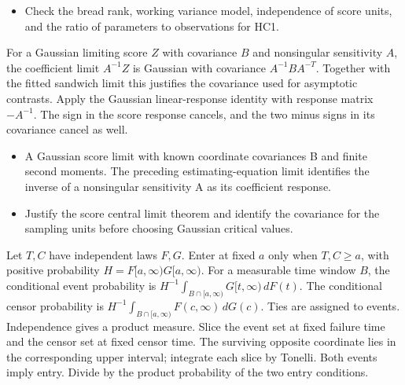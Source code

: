 \expandafter\def\csname statadic@diagnostics@STATADIC-GLMCOV-004\endcsname{\begin{itemize}
\item Check the bread rank, working variance model, independence of score units, and the ratio of parameters to observations for HC1.
\end{itemize}}
\expandafter\def\csname statadic@statement@STATADIC-GLMCOV-005\endcsname{For a Gaussian limiting score $Z$ with covariance $B$ and
  nonsingular sensitivity $A$, the coefficient limit $A^{-1}Z$ is Gaussian
  with covariance $A^{-1} B A^{-T}$. Together with the fitted sandwich limit
  this justifies the covariance used for asymptotic contrasts.}
\expandafter\def\csname statadic@proof@STATADIC-GLMCOV-005\endcsname{Apply the Gaussian linear-response identity with response
  matrix $-A^{-1}$. The sign in the score response cancels, and the two minus
  signs in its covariance cancel as well.}
\expandafter\def\csname statadic@assumptions@STATADIC-GLMCOV-005\endcsname{\begin{itemize}
\item A Gaussian score limit with known coordinate covariances B and finite second moments. The preceding estimating-equation limit identifies the inverse of a nonsingular sensitivity A as its coefficient response.
\end{itemize}}
\expandafter\def\csname statadic@diagnostics@STATADIC-GLMCOV-005\endcsname{\begin{itemize}
\item Justify the score central limit theorem and identify the covariance for the sampling units before choosing Gaussian critical values.
\end{itemize}}
\expandafter\def\csname statadic@statement@STATADIC-SURVIVAL-003\endcsname{Let $T,C$ have independent laws $F,G$. Enter at fixed $a$
  only when $T,C\ge a$, with positive probability $H=F[a,\infty)G[a,\infty)$.
  For a measurable time window $B$, the conditional event probability is
  $H^{-1}\int_{B\cap[a,\infty)}G[t,\infty)\,dF(t)$.
  The conditional censor probability is
  $H^{-1}\int_{B\cap[a,\infty)}F(c,\infty)\,dG(c)$. Ties are assigned to events.}
\expandafter\def\csname statadic@proof@STATADIC-SURVIVAL-003\endcsname{Independence gives a product measure. Slice the event set
  at fixed failure time and the censor set at fixed censor time. The surviving
  opposite coordinate lies in the corresponding upper interval; integrate each
  slice by Tonelli. Both events imply entry. Divide by the product probability
  of the two entry conditions.}
